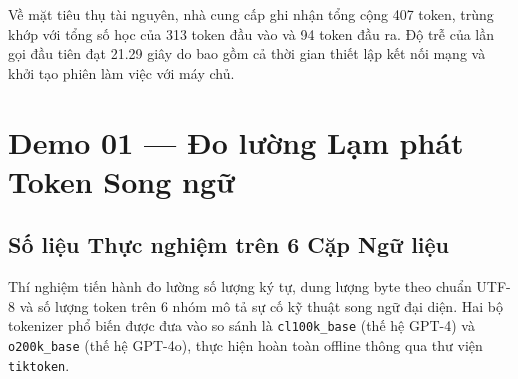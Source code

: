 \documentclass[11pt,a4paper]{article}
\begin{document}
Về mặt tiêu thụ tài nguyên, nhà cung cấp ghi nhận tổng cộng 407 token, trùng khớp với tổng số học của 313 token đầu vào và 94 token đầu ra. Độ trễ của lần gọi đầu tiên đạt 21.29 giây do bao gồm cả thời gian thiết lập kết nối mạng và khởi tạo phiên làm việc với máy chủ.

\section{Demo 01 — Đo lường Lạm phát Token Song ngữ}

\subsection{Số liệu Thực nghiệm trên 6 Cặp Ngữ liệu}

Thí nghiệm tiến hành đo lường số lượng ký tự, dung lượng byte theo chuẩn UTF-8 và số lượng token trên 6 nhóm mô tả sự cố kỹ thuật song ngữ đại diện. Hai bộ tokenizer phổ biến được đưa vào so sánh là \texttt{cl100k\_base} (thế hệ GPT-4) và \texttt{o200k\_base} (thế hệ GPT-4o), thực hiện hoàn toàn offline thông qua thư viện \texttt{tiktoken}.
\end{document}
